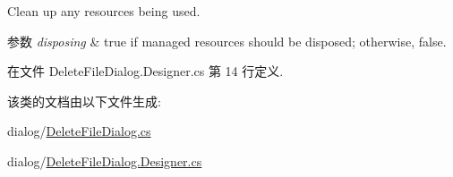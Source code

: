 Clean up any resources being used. 


\begin{DoxyParams}{参数}
{\em disposing} & true if managed resources should be disposed; otherwise, false.\\
\hline
\end{DoxyParams}


在文件 Delete\+File\+Dialog.\+Designer.\+cs 第 14 行定义.



该类的文档由以下文件生成\+:\begin{DoxyCompactItemize}
\item 
dialog/\hyperlink{_delete_file_dialog_8cs}{Delete\+File\+Dialog.\+cs}\item 
dialog/\hyperlink{_delete_file_dialog_8_designer_8cs}{Delete\+File\+Dialog.\+Designer.\+cs}\end{DoxyCompactItemize}
